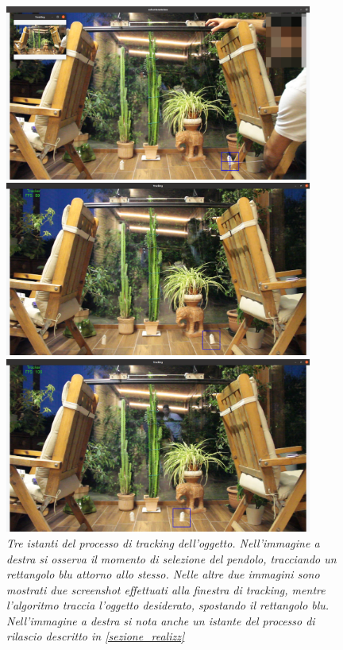 \documentclass[11pt, a4paper, twoside, italian]{article}
\begin{document}
\begin{figure}[h!]
  \centering
\begin{minipage}{0.3\textwidth}
  \centering
  \includegraphics[width=0.9\textwidth]{../../media/img/tracking_1.png}
\end{minipage}
\begin{minipage}{0.3\textwidth}
  \centering
  \includegraphics[width=0.9\textwidth]{../../media/img/tracking_2.png}
\end{minipage}
\begin{minipage}{0.3\textwidth}
  \centering
  \includegraphics[width=0.9\textwidth]{../../media/img/tracking_3.png}
\end{minipage}
\caption{\textit{Tre istanti del processo di tracking dell'oggetto.
Nell'immagine a destra si osserva il momento di selezione del pendolo, tracciando un rettangolo blu attorno 
allo stesso. Nelle altre due immagini sono mostrati due screenshot effettuati alla 
finestra di tracking, mentre l'algoritmo traccia l'oggetto desiderato, spostando il rettangolo blu.
Nell'immagine a destra si nota anche un istante del processo di rilascio descritto in \cref{sezione_realizz}}}
\label{photo_tracking}
\end{figure}
\end{document}
